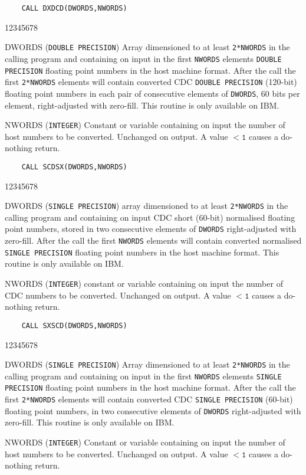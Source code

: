 \begin{verbatim}
    CALL DXDCD(DWORDS,NWORDS)
\end{verbatim}
\begin{DLtt}{12345678}
\item[DWORDS] ({\tt DOUBLE PRECISION}) Array dimensioned to at
least {\tt 2*NWORDS} in the calling program and containing on input
in the first {\tt NWORDS} elements {\tt DOUBLE PRECISION} floating point
numbers in the host machine format. After the call the first
{\tt 2*NWORDS} elements will contain converted CDC
{\tt DOUBLE PRECISION} (120-bit) floating point numbers in each pair of
consecutive elements of {\tt DWORDS}, 60 bits per element,
right-adjusted with zero-fill. This routine is only available on IBM.
\item[NWORDS] ({\tt INTEGER}) Constant or variable containing on input
the number of host numbers to be converted. Unchanged on output. A
value $\mathtt{< 1}$ causes a do-nothing return.
\end{DLtt}
\begin{verbatim}
    CALL SCDSX(DWORDS,NWORDS)
\end{verbatim}
\begin{DLtt}{12345678}
\item[DWORDS] ({\tt SINGLE PRECISION}) array dimensioned to at least
{\tt 2*NWORDS} in the calling program and containing on input CDC
short (60-bit) normalised floating point numbers, stored in two
consecutive elements of {\tt DWORDS} right-adjusted with zero-fill.
After the call the first {\tt NWORDS} elements will contain
converted normalised {\tt SINGLE PRECISION} floating point numbers in
the host machine format. This routine is only available on IBM.
\item[NWORDS] ({\tt INTEGER}) constant or variable containing on input
the number of CDC numbers to be converted. Unchanged on output. A
value $\mathtt{< 1}$ causes a do-nothing return.
\end{DLtt}
\begin{verbatim}
    CALL SXSCD(DWORDS,NWORDS)
\end{verbatim}
\begin{DLtt}{12345678}
\item[DWORDS] ({\tt SINGLE PRECISION}) Array dimensioned to at least
{\tt 2*NWORDS} in the calling program and containing on input in the
first {\tt NWORDS} elements {\tt SINGLE PRECISION} floating point
numbers in the host machine format. After the call the first
{\tt 2*NWORDS} elements will contain converted CDC
{\tt SINGLE PRECISION} (60-bit) floating point numbers, in two
consecutive elements of {\tt DWORDS} right-adjusted with zero-fill.
This routine is only available on IBM.
\item[NWORDS] ({\tt INTEGER}) Constant or variable containing on input
the number of host numbers to be converted. Unchanged on output. A
value $\mathtt{< 1}$ causes a do-nothing return.
\end{DLtt}
